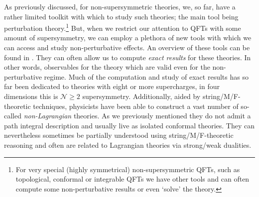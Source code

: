 \documentclass[main.tex]{subfiles}
\begin{document}
As previously discussed, for non-supersymmetric theories, we, so far, have a rather limited toolkit with which to study such theories; the main tool being perturbation theory.\footnote{For very special (highly symmetrical) non-supersymmetric QFTs, such as topological, conformal or integrable QFTs we have other tools and can often compute some non-perturbative results or even `solve' the theory.} But, when we restrict our attention to QFTs with some amount of supersymmetry, we can employ a plethora of new tools with which we can access and study non-perturbative effects.  An overview of these tools can be found in \cite{Tachikawa:2013kta,Teschner:2016yzf,Pestun:2016zxk,Tachikawa:2018sae}.  They can often allow us to compute \textit{exact results} for these theories. In other words, observables for the theory which are valid even for the non-perturbative regime.  Much of the computation and study of exact results has so far been dedicated to theories with eight or more supercharges, in four dimensions this is $\mathcal{N}\geq2$ supersymmetry.  Additionally, aided by string/M/F-theoretic techniques, physicists have been able to construct a vast number of so-called \textit{non-Lagrangian} theories.  As we previously mentioned they do not admit a path integral description and usually live as isolated conformal theories.  They can nevertheless sometimes be partially understood using string/M/F-theoretic reasoning and often are related to Lagrangian theories via strong/weak dualities.
\end{document}
